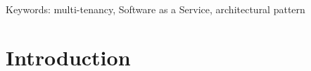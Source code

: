 \documentclass[conference]{sasmoota2017}
\begin{document}

Keywords: multi-tenancy, Software as a Service, architectural pattern



\IEEEpeerreviewmaketitle



\section{Introduction}
%
%
%
\end{document}
